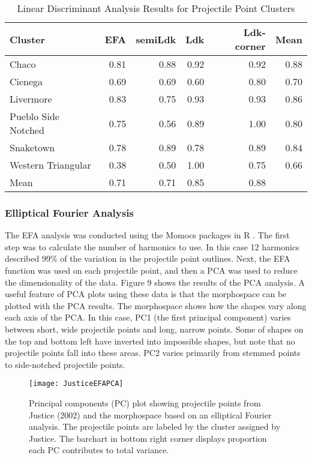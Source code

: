 \documentclass[PCJ,Unicode,screen,mode=plain]{cedram}
\begin{document}
\begin{table}

\caption{\label{tab:LDAResultsCluster}Linear Discriminant Analysis Results for Projectile Point Clusters}
\centering
\begin{tabular}[t]{lrrrrr}
\toprule
Cluster & EFA & semiLdk & Ldk & Ldk-corner & Mean\\
\midrule
Chaco & 0.81 & 0.88 & 0.92 & 0.92 & 0.88\\
Cienega & 0.69 & 0.69 & 0.60 & 0.80 & 0.70\\
Livermore & 0.83 & 0.75 & 0.93 & 0.93 & 0.86\\
Pueblo Side Notched & 0.75 & 0.56 & 0.89 & 1.00 & 0.80\\
Snaketown & 0.78 & 0.89 & 0.78 & 0.89 & 0.84\\
\addlinespace
Western Triangular & 0.38 & 0.50 & 1.00 & 0.75 & 0.66\\
Mean & 0.71 & 0.71 & 0.85 & 0.88 & \\
\bottomrule
\end{tabular}
\end{table}

\subsubsection{Elliptical Fourier Analysis}

The EFA analysis was conducted using the Momocs packages \autocite{Bonhomme2014-gt} in R \autocite{R_Core_Team2022-wb}. The first step was to calculate the number of harmonics to use. In this case 12 harmonics described 99\% of the variation in the projectile point outlines. Next, the EFA function was used on each projectile point, and then a PCA was used to reduce the dimensionality of the data. Figure 9 shows the results of the PCA analysis. A useful feature of PCA plots using these data is that the morphospace can be plotted with the PCA results. The morphospace shows how the shapes vary along each axis of the PCA. In this case, PC1 (the first principal component) varies between short, wide projectile points and long, narrow points. Some of shapes on the top and bottom left have inverted into impossible shapes, but note that no projectile points fall into these areas. PC2 varies primarily from stemmed points to side-notched projectile points.

\begin{figure}
\texttt{[image: JusticeEFAPCA]} \caption{Principal components (PC) plot showing projectile points from Justice (2002) and the morphospace based on an elliptical Fourier analysis. The projectile points are labeled by the cluster assigned by Justice. The barchart in bottom right corner displays proportion each PC contributes to total variance.}\label{fig:JusticeEFAPCA}
\end{figure}
\end{document}

